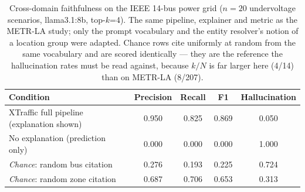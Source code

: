 \begin{table}[t]
\centering
\caption{Cross-domain faithfulness on the IEEE 14-bus power grid ($n=20$ undervoltage scenarios, llama3.1:8b, top-$k$=4). The same pipeline, explainer and metric as the METR-LA study; only the prompt vocabulary and the entity resolver's notion of a location group were adapted. Chance rows cite uniformly at random from the same vocabulary and are scored identically --- they are the reference the hallucination rates must be read against, because $k/N$ is far larger here (4/14) than on METR-LA (8/207).}
\label{tab:power_grid_faith}
\begin{tabular}{lcccc}
\toprule
Condition & Precision & Recall & F1 & Hallucination \\
\midrule
XTraffic full pipeline (explanation shown) & 0.950 & 0.825 & 0.869 & 0.050 \\
No explanation (prediction only) & 0.000 & 0.000 & 0.000 & 1.000 \\
\emph{Chance}: random bus citation & 0.276 & 0.193 & 0.225 & 0.724 \\
\emph{Chance}: random zone citation & 0.687 & 0.706 & 0.653 & 0.313 \\
\bottomrule
\end{tabular}
\end{table}
